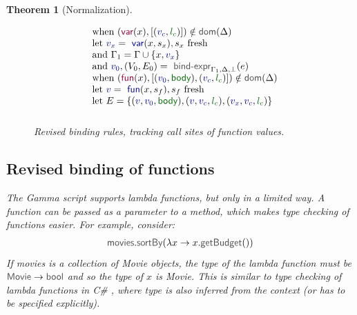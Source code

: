 \documentclass[acmsmall,anonymous,fleqn]{acmart}\settopmatter{printfolios=false,printccs=false,printacmref=false}
\newcounter{thc}
\theoremstyle{plain}
\newtheorem{theorem}[thc]{Theorem}
\theoremstyle{definition}
\newcommand{\ident}[1]{\textnormal{\textcolor{idclr}{\sffamily #1}}}
\newcommand{\bndclr}[1]{\textcolor{kvdclr}{#1}}
\newcommand{\blblclr}[1]{\textcolor{numclr}{#1}}
\newcommand{\bnd}[1]{\textnormal{\textcolor{kvdclr}{\sffamily #1}}}
\newcommand{\bknd}[1]{\textnormal{\textcolor{prepclr}{\sffamily #1}}}
\newcommand{\blbl}[1]{\textnormal{\textcolor{numclr}{\sffamily #1}}}
\begin{document}
\begin{theorem}[Normalization]
\begin{figure}[t]
\begin{equation*}
\begin{array}{ll}
\quad \textnormal{when}~(\bknd{var}(x),[(\bndclr{v_c}, \blblclr{l_c} )])\notin \ident{dom}(\Delta)\\
\quad \textnormal{let}~\bndclr{v_x} = \bnd{var}(x, s_x), s_x~\textnormal{fresh}\\
\quad \textnormal{and}~\Gamma_1 = \Gamma \cup \{ x, \bndclr{v_x} \}\\
\quad \textnormal{and}~\bndclr{v_0}, (V_0, E_0) = \ident{bind-expr}_{\Gamma_1, \Delta, \bot}(e)\\
\quad \textnormal{when}~(\bknd{fun}(x),[(\bndclr{v_0}, \blbl{body}), (\bndclr{v_c}, \blblclr{l_c} )])\notin \ident{dom}(\Delta)\\
\quad \textnormal{let}~\bndclr{v} = \bnd{fun}(x, s_f), s_f~\textnormal{fresh}\\
\quad \textnormal{let}~E = \{ (\bndclr{v},\bndclr{v_0},\blbl{body}), (\bndclr{v},\bndclr{v_c},\blblclr{l_c}), (\bndclr{v_x},\bndclr{v_c},\blblclr{l_c}) \}
\\[0.75em]
\end{array}
\end{equation*}
\vspace{-0.5em}
\caption{Revised binding rules, tracking call sites of function values.}
\label{fig:binding-rules-callsite}
\vspace{-0.5em}
\end{figure}


\subsection{Revised binding of functions}
\label{sec:types-funs}

The Gamma script supports lambda functions, but only in a limited way. A function can be passed
as a parameter to a method, which makes type checking of functions easier. For example, consider:
%
\begin{equation*}
\begin{array}{l}
\ident{movies}.\ident{sortBy}(\lambda x \rightarrow x.\ident{getBudget}())
\end{array}
\end{equation*}
%
If \ident{movies} is a collection of \ident{Movie} objects, the type of the lambda function must be
$\ident{Movie}\rightarrow\ident{bool}$ and so the type of $x$ is \ident{Movie}. This is similar to
type checking of lambda functions in C\# \cite{csharp}, where type is also inferred from the context (or has
to be specified explicitly).


\end{theorem}
\end{document}

